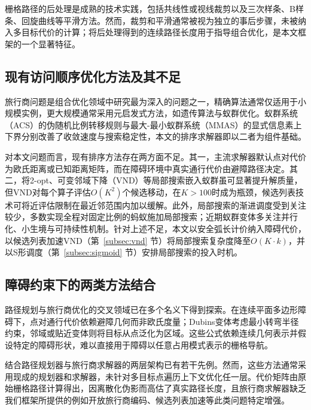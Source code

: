 \documentclass[lettersize,journal]{IEEEtran}
\begin{document}
栅格路径的后处理是成熟的技术实践，包括共线性或视线裁剪\textcolor{blue}{\cite{ref16}}以及三次样条、B样条、回旋曲线等平滑方法\textcolor{blue}{\cite{ref17,ref18,ref41}}。然而，裁剪和平滑通常被视为独立的事后步骤，未被纳入多目标代价的计算；将后处理得到的连续路径长度用于指导组合优化，是本文框架的一个显著特征。

\subsection{现有访问顺序优化方法及其不足}

旅行商问题是组合优化领域中研究最为深入的问题之一\textcolor{blue}{\cite{ref4,ref36}}，精确算法通常仅适用于小规模实例，更大规模通常采用元启发式方法，如遗传算法\textcolor{blue}{\cite{ref19}}与蚁群优化\textcolor{blue}{\cite{ref21,ref42}}。蚁群系统（ACS）的伪随机比例转移规则\textcolor{blue}{\cite{ref22}}与最大-最小蚁群系统（MMAS）的显式信息素上下界\textcolor{blue}{\cite{ref23}}分别改善了收敛速度与搜索稳定性，本文的排序求解器即以二者为组件基础。

对本文问题而言，现有排序方法存在两方面不足。其一，主流求解器默认点对代价为欧氏距离或已知距离矩阵，而在障碍环境中真实通行代价由避障路径决定。其二，将2-opt、可变邻域下降（VND）等局部搜索嵌入蚁群虽可显著提升解质量\textcolor{blue}{\cite{ref24,ref25,ref43}}，但VND对每个算子评估$O(K^2)$个候选移动，在$K > 100$时成为瓶颈，候选列表技术可将近评估限制在最近邻范围内加以缓解\textcolor{blue}{\cite{ref26}}。此外，局部搜索的渐进调度受到关注较少，多数实现全程对固定比例的蚂蚁施加局部搜索；近期蚁群变体多关注并行化、小生境与可持续性机制\textcolor{blue}{\cite{ref27,ref28,ref29,ref30}}。针对上述不足，本文以安全弧长计价纳入障碍代价，以候选列表加速VND（第~\textcolor{blue}{\ref{subsec:vnd}} 节）将局部搜索复杂度降至$O(K \cdot k)$，并以S形调度（第~\textcolor{blue}{\ref{subsec:sigmoid}} 节）安排局部搜索的投入时机。

\subsection{障碍约束下的两类方法结合}

路径规划与旅行商优化的交叉领域已在多个名义下得到探索\textcolor{blue}{\cite{ref4,ref36}}。在连续平面多边形障碍下，点对通行代价依赖避障几何而非欧氏度量\textcolor{blue}{\cite{ref39}}；Dubins变体考虑最小转弯半径约束，邻域或贴近变体则将目标从点泛化为区域\textcolor{blue}{\cite{ref40}}。这些公式依赖连续几何表示并假设特定的障碍形状，难以直接用于障碍以任意占用模式表示的栅格导航。

结合路径规划器与旅行商求解器的两层架构已有若干先例\textcolor{blue}{\cite{ref1,ref2}}。然而，这些方法通常采用现成的规划器和求解器，未针对多目标点遍历上下文优化任一层。代价矩阵由原始栅格路径计算得出，因离散化伪影而高估了真实路径长度，且旅行商求解器缺乏我们框架所提供的例如开放旅行商编码、候选列表加速等此类问题特定增强。
\end{document}
